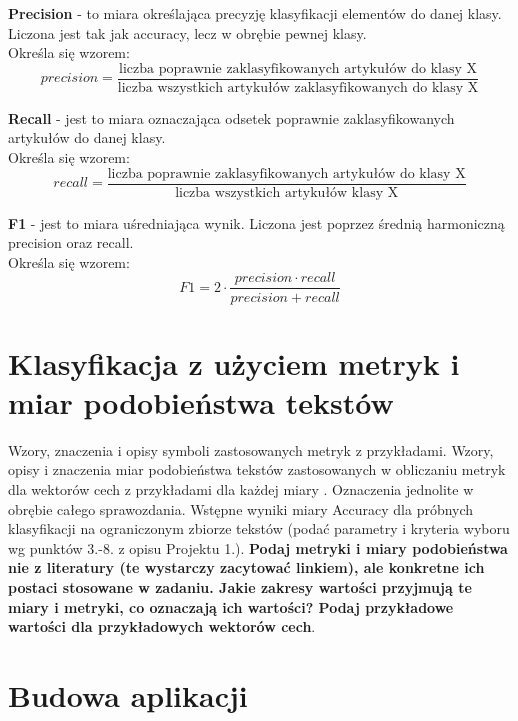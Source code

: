 \documentclass{classrep}
\begin{document}
{\bf Precision} - to miara określająca precyzję klasyfikacji elementów do danej klasy. Liczona jest tak jak accuracy, lecz w obrębie pewnej klasy.\\
Określa się wzorem:
\begin{displaymath}
precision = \frac{\textrm{liczba poprawnie zaklasyfikowanych artykułów do klasy X}}{\textrm{liczba wszystkich artykułów zaklasyfikowanych do klasy X}}
\end{displaymath}

{\bf Recall} - jest to miara oznaczająca odsetek poprawnie zaklasyfikowanych artykułów do danej klasy.\\
Określa się wzorem:
\begin{displaymath}
recall = \frac{\textrm{liczba poprawnie zaklasyfikowanych artykułów do klasy X}}{\textrm{liczba wszystkich artykułów klasy X}}
\end{displaymath}

{\bf F1} - jest to miara uśredniająca wynik. Liczona jest poprzez średnią harmoniczną precision oraz recall.\\
Określa się wzorem:
\begin{displaymath}
F1 = 2 \cdot  \frac{precision \cdot recall}{precision + recall}
\end{displaymath}


\section{Klasyfikacja z użyciem metryk i miar podobieństwa tekstów}
Wzory, znaczenia i opisy symboli zastosowanych metryk z
przykładami. Wzory, opisy i znaczenia miar
podobieństwa tekstów zastosowanych w obliczaniu metryk dla wektorów cech z
przykładami dla każdej miary \cite{niewiadomski08}.  Oznaczenia jednolite w obrębie całego sprawozdania.  Wstępne wyniki miary Accuracy dla próbnych klasyfikacji na ograniczonym zbiorze tekstów (podać parametry i kryteria
wyboru wg punktów 3.-8. z opisu Projektu 1.). {\bf Podaj metryki i miary
podobieństwa nie z literatury (te wystarczy zacytować linkiem), ale konkretne ich
postaci stosowane w zadaniu. Jakie zakresy wartości przyjmują te miary i
metryki, co oznaczają ich wartości? Podaj przykładowe wartości dla przykładowych wektorów cech}. \\ 

\section{Budowa aplikacji}
\end{document}
